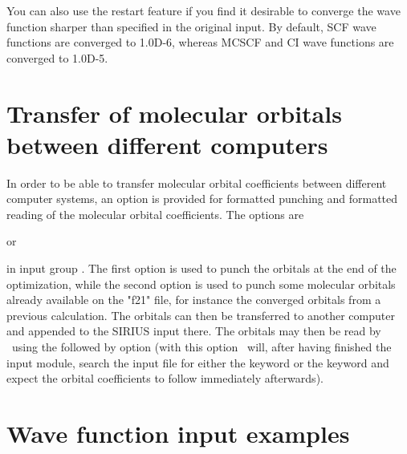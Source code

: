 \noindent
You can also use the restart feature if you
find it desirable to converge the wave
function sharper than specified 
in the original input. By default, SCF wave functions are converged to
1.0D-6, whereas MCSCF and CI wave functions are converged to 1.0D-5.
 
\pagebreak[2]
\section{\label{sec:ig_orbtransfer}
Transfer of molecular orbitals between different computers}
 
In order to be able to transfer molecular orbital coefficients between
different computer systems, 
an option is provided for
formatted punching and formatted reading of the molecular orbital
coefficients.  The options are
\begin{center}
    or 
\end{center}
in input group .
The first option
is used to punch the orbitals at the end of the optimization, while the
second option is used to punch some molecular orbitals already available 
on the "f21" file, for instance the converged orbitals from a previous
calculation.  The orbitals can then be transferred to another computer
and appended to the SIRIUS input there.
The orbitals may then be read by \siraba\ using the 
followed by  option  (with this option \siraba\ will,
after having finished the  input module,
search the input file for either the  keyword
or the  keyword
and expect the orbital coefficients to follow immediately afterwards).


\section{\label{examples} Wave function input examples}

